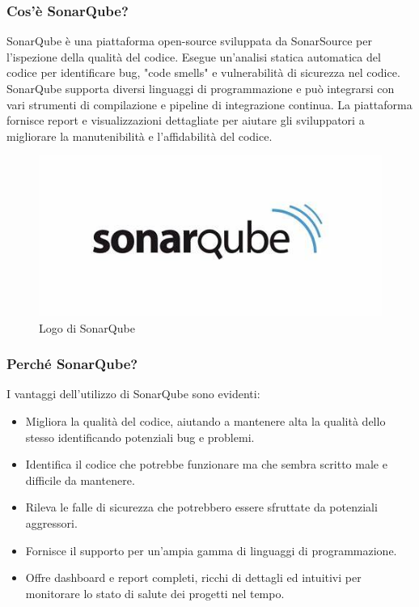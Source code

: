         \subsubsection{Cos'è SonarQube?}
            SonarQube è una piattaforma open-source sviluppata da SonarSource per l'ispezione della qualità del codice. Esegue un'analisi statica automatica del codice per identificare bug, "code smells" e vulnerabilità di sicurezza nel codice. SonarQube supporta diversi linguaggi di programmazione e può integrarsi con vari strumenti di compilazione e pipeline di integrazione continua. La piattaforma fornisce report e visualizzazioni dettagliate per aiutare gli sviluppatori a migliorare la manutenibilità e l'affidabilità del codice.
        \begin{figure}[htbp!]
                \centering
                \includegraphics[width=0.5\linewidth]{Immagini/System Design/SonarQube.jpg}
                \caption{Logo di SonarQube}
        \end{figure}
        \subsubsection{Perché SonarQube?}
            I vantaggi dell'utilizzo di SonarQube sono evidenti:
            \begin{itemize}
                \item Migliora la qualità del codice, aiutando a mantenere alta la qualità dello stesso identificando potenziali bug e problemi.
                \item Identifica il codice che potrebbe funzionare ma che sembra scritto male e difficile da mantenere.
                \item Rileva le falle di sicurezza che potrebbero essere sfruttate da potenziali aggressori.
                \item Fornisce il supporto per un'ampia gamma di linguaggi di programmazione.
                \item Offre dashboard e report completi, ricchi di dettagli ed intuitivi per monitorare lo stato di salute dei progetti nel tempo.
            \end{itemize}